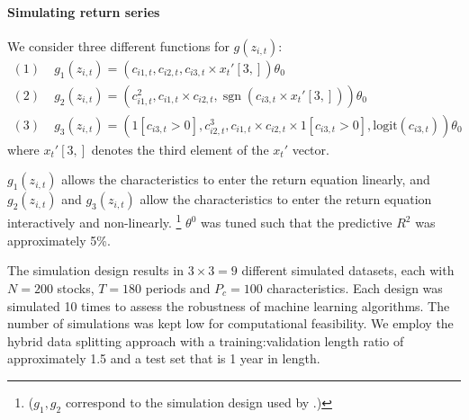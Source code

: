 \documentclass{article}
\begin{document}
\paragraph{Simulating return series}
We consider three different functions for $g(z_{i, t})$:
\begin{align}
(1)\; & g_1 \left(z_{i, t}\right)=\left(c_{i 1, t}, c_{i 2, t}, c_{i 3, t} \times x_{t}'[3,]\right) \theta_{0} \\
(2)\; & g_2 \left(z_{i, t}\right)=\left(c_{i 1, t}^{2}, c_{i 1, t} \times c_{i 2, t}, \operatorname{sgn}\left(c_{i 3, t} \times  x_{t}'[3,]\right)\right) \theta_{0} \\
(3)\; & g_3 \left(z_{i, t}\right) = \left(1[c_{i3,t}>0],c_{i 2, t}^{3}, c_{i 1, t} \times c_{i 2, t}\times 1[c_{i3,t}>0], \text{logit}\left({c}_{i3, t} \right)\right) \theta_{0}
\end{align}
where $x_{t}'[3,]$ denotes the third element of the $x_{t}'$ vector.

$g_1 \left(z_{i, t}\right)$ allows the characteristics to enter the return equation linearly, and $g_2 \left(z_{i, t}\right)$ and $g_3 \left(z_{i, t}\right)$ allow the characteristics to enter the return equation interactively and non-linearly. \footnote{($g_1, g_2$ correspond to the simulation design used by \cite{gu_empirical_2018}.)} $\theta^0$ was tuned such that the predictive $R^2$ was approximately 5\%.

The simulation design results in $3 \times 3 = 9$ different simulated datasets, each with $N = 200$ stocks, $T = 180$ periods and $P_c = 100$ characteristics. Each design was simulated 10 times to assess the robustness of machine learning algorithms. The number of simulations was kept low for computational feasibility. We employ the hybrid data splitting approach with a training:validation length ratio of approximately 1.5 and a test set that is 1 year in length. 

\end{document}
